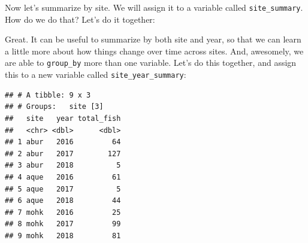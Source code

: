 \documentclass[]{book}
\newenvironment{Shaded}{\begin{snugshade}}{\end{snugshade}}
\newcommand{\DataTypeTok}[1]{\textcolor[rgb]{0.13,0.29,0.53}{#1}}
\newcommand{\KeywordTok}[1]{\textcolor[rgb]{0.13,0.29,0.53}{\textbf{#1}}}
\newcommand{\NormalTok}[1]{#1}
\newcommand{\OperatorTok}[1]{\textcolor[rgb]{0.81,0.36,0.00}{\textbf{#1}}}
\newcommand{\StringTok}[1]{\textcolor[rgb]{0.31,0.60,0.02}{#1}}
\begin{document}
\begin{Shaded}
\end{Shaded}

Now let's summarize by site. We will assign it to a variable called \texttt{site\_summary}. How do we do that? Let's do it together:

\begin{Shaded}
\end{Shaded}

Great. It can be useful to summarize by both site and year, so that we can learn a little more about how things change over time across sites. And, awesomely, we are able to \texttt{group\_by} more than one variable. Let's do this together, and assign this to a new variable called \texttt{site\_year\_summary}:

\begin{Shaded}
\end{Shaded}

\begin{verbatim}
## # A tibble: 9 x 3
## # Groups:   site [3]
##   site   year total_fish
##   <chr> <dbl>      <dbl>
## 1 abur   2016         64
## 2 abur   2017        127
## 3 abur   2018          5
## 4 aque   2016         61
## 5 aque   2017          5
## 6 aque   2018         44
## 7 mohk   2016         25
## 8 mohk   2017         99
## 9 mohk   2018         81
\end{verbatim}
\end{document}
